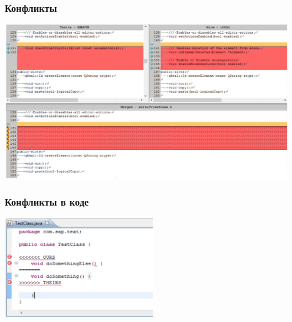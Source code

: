 \documentclass[xetex,mathserif,serif]{beamer}
\begin{document}
    \begin{frame}
        \frametitle{Конфликты}
        \begin{center}
            \includegraphics[width=0.95\textwidth]{conflicts.png}
        \end{center}
    \end{frame}

    \begin{frame}
        \frametitle{Конфликты в коде}
        \begin{center}
            \includegraphics[width=0.5\textwidth]{conflictsInCode.png}
        \end{center}
    \end{frame}
\end{document}
